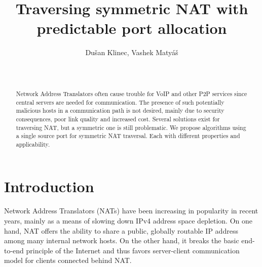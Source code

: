 \documentclass{acm_proc_article-sp}
\begin{document}
\title{Traversing symmetric NAT with predictable port allocation}

\author{
\alignauthor
Du\v{s}an Klinec, Vashek Maty\'{a}\v{s}\\
       \\
       \\
}

\maketitle
\begin{abstract}
\noindent Network Address Translators often cause trouble for VoIP and other P2P services since central servers are needed for communication.
The presence of such potentially malicious hosts in a communication path is not desired, mainly due to security consequences, poor link quality 
and increased cost.
Several solutions exist for traversing NAT, but a symmetric one is still problematic. We propose algorithms using a single source port for 
symmetric NAT traversal. Each with different properties and applicability. 
\end{abstract}

\section{Introduction}
Network Address Translators (NATs) have been increasing in popularity in recent years, 
mainly as a means of slowing down IPv4 address space depletion. On one hand, NAT offers
the ability to share a public, globally routable IP address among many internal network hosts. On 
the other hand, it breaks the basic end-to-end principle of the Internet and thus favors server-client 
communication model for clients connected behind NAT.
\end{document}
